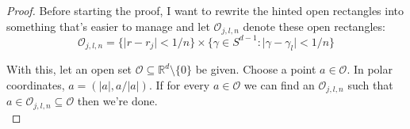 \documentclass{article}
\theoremstyle{theorem}
\theoremstyle{remark}
\begin{document}
\begin{proof}
Before starting the proof, I want to rewrite the hinted open rectangles into something that's easier to manage and let $\mathcal{O}_{j,l,n}$ denote these open rectangles:
\begin{equation*}
    \mathcal{O}_{j,l,n} = \{ \vert r - r_j \vert < 1/n \} \times \{ \gamma \in S^{d-1} : \vert \gamma - \gamma_l \vert < 1/n\}
\end{equation*}

With this, let an open set $\mathcal{O} \subseteq \mathbb{R}^d \setminus \{ 0 \}$ be given. Choose a point $a\in \mathcal{O}$. In polar coordinates, $a = (\vert a \vert, a/\vert a\vert)$. If for every $a \in \mathcal{O}$ we can find an $\mathcal{O}_{j,l,n}$ such that $a\in \mathcal{O}_{j,l,n} \subseteq \mathcal{O}$ then we're done. \\


\end{proof}
\end{document}
